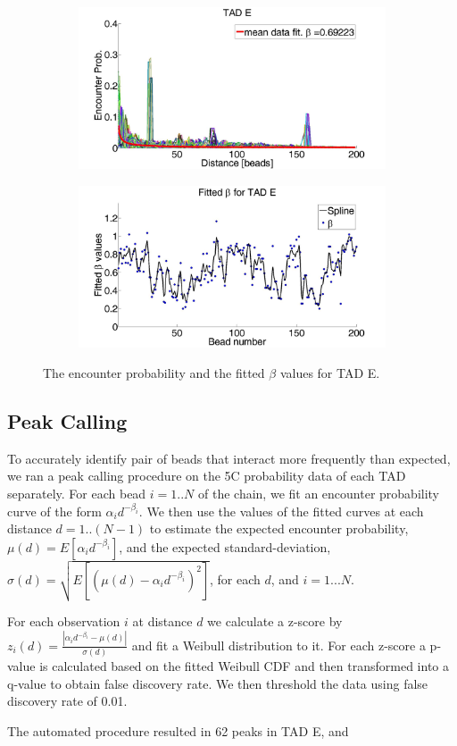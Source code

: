 \documentclass[12pt]{article}
\begin{document}
\begin{figure}[H]
 \begin{subfigure}[b]{0.3\textwidth}
 \includegraphics[scale=0.2]{meanDataFitTADE}
 \caption{}
 \end{subfigure}
 
 \begin{subfigure}[b]{0.3\textwidth}
\includegraphics[scale=0.2]{fittedExpValuesWithSplineAverageTADE}
\caption{}
 \end{subfigure}
\caption{The encounter probability and the fitted $\beta$ values for TAD E.}
\end{figure}
\subsection{Peak Calling}
To accurately identify pair of beads that interact more frequently than expected, we ran a peak calling procedure on the 5C probability data of each TAD separately. For each bead $i=1..N$ of the chain, we fit an encounter probability curve of the form 
$\alpha_i d^{-\beta_i}$. We then use the values of the fitted curves at each distance $d=1..(N-1)$  to estimate the expected encounter probability, $\mu(d) = E[\alpha_i d^{-\beta_i}]$, and the expected standard-deviation, $\sigma(d)=\sqrt{E[(\mu(d)-\alpha_i d^{-\beta_i})^2]}$, for each $d$, and $i=1...N$. 

For each observation $i$ at distance $d$ we calculate a z-score by $z_i(d)=\frac{|\alpha_i d^{-\beta_i}-\mu(d)|}{\sigma(d)}$ and fit a Weibull distribution to it. For each z-score a p-value is calculated based on the fitted Weibull CDF and then transformed into a q-value to obtain false discovery rate. We then threshold the data using false discovery rate of 0.01.

The automated procedure resulted in 62 peaks in TAD E, and 
\end{document}

